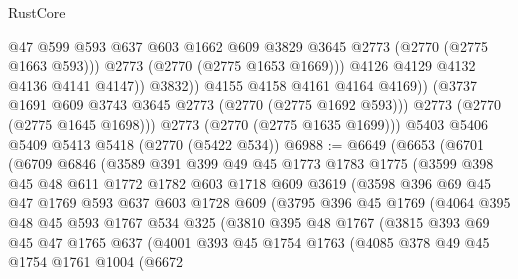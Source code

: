 \begin{lexlean}{RustCore}
\begin{coremodule}
                        @47
                        @599
                        @593
                        @637
                        @603
                        @1662
                        @609
                        @3829
                        @3645
                        @2773
                        (@2770 (@2775 @1663 @593)))
                      @2773
                      (@2770 (@2775 @1653 @1669)))
                    @4126
                    @4129
                    @4132
                    @4136
                    @4141
                    @4147))
                @3832))
            @4155
            @4158
            @4161
            @4164
            @4169))
        (@3737 @1691 @609 @3743 @3645 @2773 (@2770 (@2775 @1692 @593)))
        @2773
        (@2770 (@2775 @1645 @1698)))
      @2773
      (@2770 (@2775 @1635 @1699)))
    @5403
    @5406
    @5409
    @5413
    @5418
    (@2770 (@5422 @534))
@6988 := @6649
    (@6653
      (@6701
        (@6709
          @6846
          (@3589
            @391
            @399
            @49
            @45
            @1773
            @1783
            @1775
            (@3599
              @398
              @45
              @48
              @611
              @1772
              @1782
              @603
              @1718
              @609
              @3619
              (@3598
                @396
                @69
                @45
                @47
                @1769
                @593
                @637
                @603
                @1728
                @609
                (@3795
                  @396
                  @45
                  @1769
                  (@4064
                    @395
                    @48
                    @45
                    @593
                    @1767
                    @534
                    @325
                    (@3810
                      @395
                      @48
                      @1767
                      (@3815
                        @393
                        @69
                        @45
                        @47
                        @1765
                        @637
                        (@4001
                          @393
                          @45
                          @1754
                          @1763
                          (@4085
                            @378
                            @49
                            @45
                            @1754
                            @1761
                            @1004
                            (@6672

\end{coremodule}
\end{lexlean}
